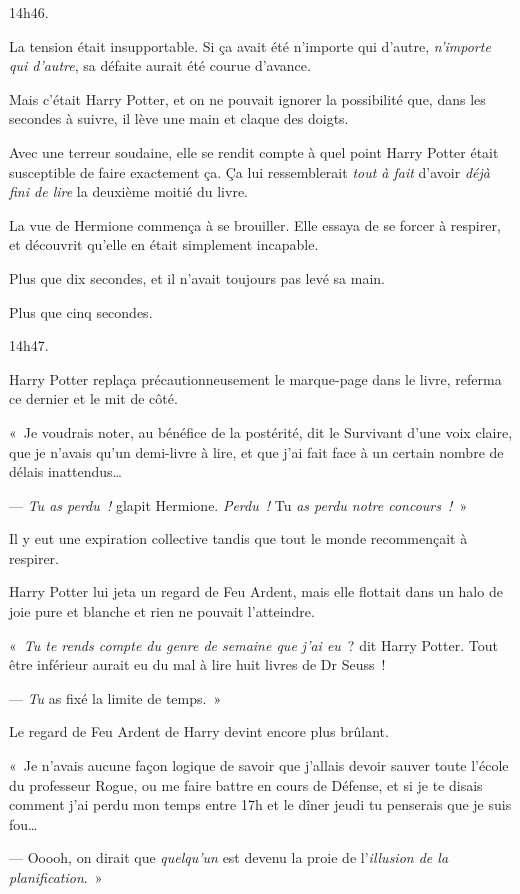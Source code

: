 14h46.

La tension était insupportable.
Si ça avait été n'importe qui d'autre, \emph{n'importe qui d'autre}, sa défaite aurait été courue d'avance.

Mais c'était Harry Potter, et on ne pouvait ignorer la possibilité que, dans les secondes à suivre, il lève une main et claque des doigts.

Avec une terreur soudaine, elle se rendit compte à quel point Harry Potter était susceptible de faire exactement ça.
Ça lui ressemblerait \emph{tout à fait} d'avoir \emph{déjà fini de lire} la deuxième moitié du livre.

La vue de Hermione commença à se brouiller.
Elle essaya de se forcer à respirer, et découvrit qu'elle en était simplement incapable.

Plus que dix secondes, et il n'avait toujours pas levé sa main.

Plus que cinq secondes.

14h47.

Harry Potter replaça précautionneusement le marque-page dans le livre, referma ce dernier et le mit de côté.

«~Je voudrais noter, au bénéfice de la postérité, dit le Survivant d'une voix claire, que je n'avais qu'un demi-livre à lire, et que j'ai fait face à un certain nombre de délais inattendus…

--- \emph{Tu as perdu~!} glapit Hermione.
\emph{Perdu~!} Tu \emph{as perdu notre concours~!}~»

Il y eut une expiration collective tandis que tout le monde recommençait à respirer.

Harry Potter lui jeta un regard de Feu Ardent, mais elle flottait dans un halo de joie pure et blanche et rien ne pouvait l'atteindre.

«~\emph{Tu te rends compte du genre de semaine que j'ai eu}~? dit Harry Potter.
Tout être inférieur aurait eu du mal à lire huit livres de Dr Seuss~!

--- \emph{Tu} as fixé la limite de temps.~»

Le regard de Feu Ardent de Harry devint encore plus brûlant.

«~Je n'avais aucune façon logique de savoir que j'allais devoir sauver toute l'école du professeur Rogue, ou me faire battre en cours de Défense, et si je te disais comment j'ai perdu mon temps entre 17h et le dîner jeudi tu penserais que je suis fou…

--- Ooooh, on dirait que \emph{quelqu'un} est devenu la proie de l'\emph{illusion de la planification}.~»

